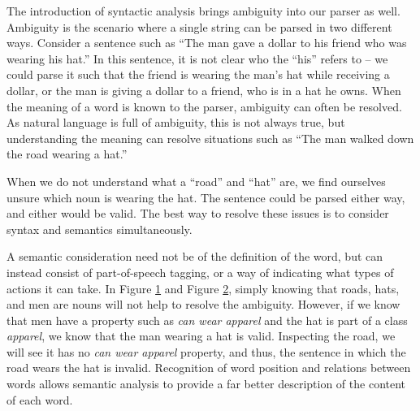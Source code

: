The introduction of syntactic analysis brings ambiguity into our parser as well. Ambiguity is the scenario where a single string can be parsed in two different ways. Consider a sentence such as ``The man gave a dollar to his friend who was wearing his hat.'' In this sentence, it is not clear who the ``his'' refers to -- we could parse it such that the friend is wearing the man's hat while receiving a dollar, or the man is giving a dollar to a friend, who is in a hat he owns. When the meaning of a word is known to the parser, ambiguity can often be resolved. As natural language is full of ambiguity, this is not always true, but understanding the meaning can resolve situations such as ``The man walked down the road wearing a hat.''  \label{issues}

\begin{figure}[!ht]
\centering

  \centering
  \label{fig:wrong}
\end{figure}
\begin{figure}[!ht]

  \centering
\label{fig:right}

\end{figure}
\noindent
When we do not understand what a ``road'' and ``hat'' are, we find ourselves unsure which noun is wearing the hat. The sentence could be parsed either way, and either would be valid. The best way to resolve these issues is to consider syntax and semantics simultaneously.

A semantic consideration need not be of the definition of the word, but can instead consist of part-of-speech tagging, or a way of indicating what types of actions it can take. In Figure \ref{fig:wrong} and Figure \ref{fig:right}, simply knowing that roads, hats, and men are nouns will not help to resolve the ambiguity. However, if we know that men have a property such as \textit{can wear apparel} and the hat is part of a class \textit{apparel}, we know that the man wearing a hat is valid. Inspecting the road, we will see it has no \textit{can wear apparel} property, and thus, the sentence in which the road wears the hat is invalid. Recognition of word position and relations between words allows semantic analysis to provide a far better description of the content of each word.

